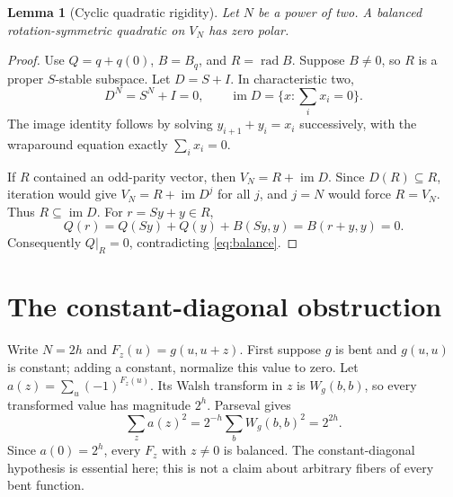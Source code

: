\documentclass[11pt,a4paper]{article}
\newcommand{\rad}{\operatorname{rad}}
\newcommand{\im}{\operatorname{im}}
\newtheorem{lemma}[theorem]{Lemma}
\begin{document}
\begin{lemma}[Cyclic quadratic rigidity]\label{lem:rigidity}
Let $N$ be a power of two. A balanced rotation-symmetric quadratic on $V_N$ has zero polar.
\end{lemma}
\begin{proof}
Use $Q=q+q(0)$, $B=B_q$, and $R=\rad B$. Suppose $B\ne0$, so $R$ is a proper $S$-stable subspace. Let $D=S+I$. In characteristic two,
\[
 D^N=S^N+I=0,\qquad
 \im D=\{x:\textstyle\sum_i x_i=0\}.
\]
The image identity follows by solving $y_{i+1}+y_i=x_i$ successively, with the wraparound equation exactly $\sum_i x_i=0$.

If $R$ contained an odd-parity vector, then $V_N=R+\im D$. Since $D(R)\subseteq R$, iteration would give $V_N=R+\im D^j$ for all $j$, and $j=N$ would force $R=V_N$. Thus $R\subseteq\im D$. For $r=Sy+y\in R$,
\[
 Q(r)=Q(Sy)+Q(y)+B(Sy,y)=B(r+y,y)=0.
\]
Consequently $Q|_R=0$, contradicting \eqref{eq:balance}.
\end{proof}

\section{The constant-diagonal obstruction}
Write $N=2h$ and $F_z(u)=g(u,u+z)$. First suppose $g$ is bent and $g(u,u)$ is constant; adding a constant, normalize this value to zero. Let $a(z)=\sum_u(-1)^{F_z(u)}$. Its Walsh transform in $z$ is $W_g(b,b)$, so every transformed value has magnitude $2^h$. Parseval gives
\begin{equation}\label{eq:fiber}
 \sum_z a(z)^2=2^{-h}\sum_bW_g(b,b)^2=2^{2h}.
\end{equation}
Since $a(0)=2^h$, every $F_z$ with $z\ne0$ is balanced. The constant-diagonal hypothesis is essential here; this is not a claim about arbitrary fibers of every bent function.
\end{document}
